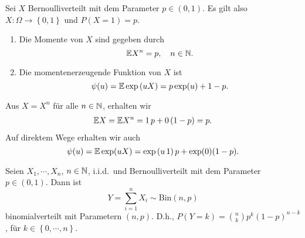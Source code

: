 Sei $X$ Bernoulliverteilt mit dem Parameter $p \in \left( 0,1 \right)$. Es gilt also
$X: \Omega \to \left\{ 0,1 \right\}$ und $P(X=1)=p$. 
\begin{enumerate}
    \item Die Momente von $X$ sind gegeben durch
        \begin{equation*}
            \mathbb{E} X^n = p, \quad n\in\mathbb N.
        \end{equation*}
    \item Die momentenerzeugende Funktion von $X$ ist 
        \begin{equation*}
            \psi(u) = \mathbb{E} \exp \left( u X \right) = p\exp (u)+1-p.
        \end{equation*} 
\end{enumerate}
\solution Aus $X = X^n$ für alle $n\in \mathbb N$, erhalten wir  
\begin{align*}
    \mathbb{E} X = \mathbb{E} X^n = 1\, p + 0\, (1-p) = p.
\end{align*}
Auf direktem Wege erhalten wir auch
\begin{equation*}
    \psi(u) = \mathbb{E} \exp (uX) = \exp\left( u\, 1 \right)p + \exp(0)(1-p).
\end{equation*}



Seien $X_1, \cdots, X_n$, $n\in\mathbb N$, i.i.d.\ und Bernoulliverteilt mit dem Parameter $p\in (0,1)$. 
Dann ist
\begin{equation*}
    Y=\sum_{i=1}^{n} X_i \sim \text{Bin}(n,p)
\end{equation*}
binomialverteilt mit Parametern $(n,p)$. D.h., $P(Y = k) = \binom{n}{k}  p^{k}(1-p)^{n-k}$, 
für $k\in \left\{ 0, \cdots, n \right\}$.

